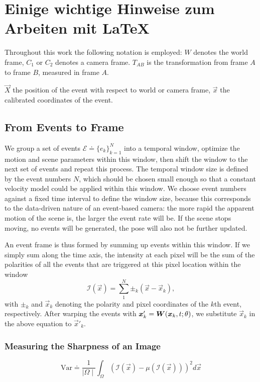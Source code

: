 \chapter{Einige wichtige Hinweise zum Arbeiten mit \LaTeX\ }
\label{sec:latexumg}

Throughout this work the following notation is employed: $W$ denotes
the world frame, $C_1$ or $C_2$ denotes a camera frame.  $T_{AB}$ is
the transformation from frame $A$ to frame $B$, measured in frame $A$.

$\vec{X}$ the position of the event with respect to world or camera
frame, $\vec{x}$ the calibrated coordinates of the event.

\section{From Events to Frame}
\label{sec:event_warp}
We group a set of events $\mathscr{E}\doteq \{e_k\}_{k=1}^N$ into a
temporal window, optimize the motion and scene parameters within this
window, then shift the window to the next set of events and repeat
this process. The temporal window size is defined by the event numbers
$N$, which should be chosen small enough so that a constant velocity
model could be applied within this window. We choose event numbers
against a fixed time interval to define the window size, because this
corresponds to the data-driven nature of an event-based camera: the
more rapid the apparent motion of the scene is, the larger the event
rate will be. If the scene stops moving, no events will be generated,
the pose will also not be further updated.

An event frame is thus formed by summing up events within this
window. If we simply sum along the time axis, the intensity at each
pixel will be the sum of the polarities of all the events that are
triggered at this pixel location within the window
\begin{equation}
  \label{eq:intensity}
  \mathcal{I}(\vec{x}) = \sum_1^N\pm_k(\vec{x}-\vec{x}_k),
\end{equation}
with $\pm_k$ and $\vec{x}_k$ denoting the polarity and pixel
coordinates of the $k$th event, respectively. After warping the events
with $\vec{x}'_k=\mat{W}(\vec{x}_k,t;\theta)$, we substitute
$\vec{x}_k$ in the above equation to $\vec{x}'_k$.

\subsection{Measuring the Sharpness of an Image}
\label{sec:contrast}
\begin{equation}
  \label{eq:variance}
  \mathrm{Var}\doteq\frac{1}{\mid\Omega\mid}\int_{\Omega}\left(\mathcal{I}\left(\vec{x}\right)-\mu\left(\mathcal{I}\left(\vec{x}\right)\right)\right)^2d\vec{x}
\end{equation}


